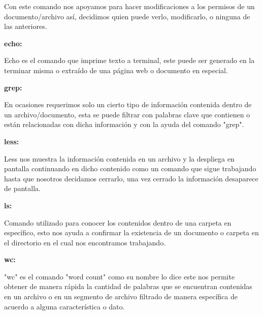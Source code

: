 \documentclass{article} %
\begin{document}
\vspace{0.5 cm}

Con este comando nos apoyamos para hacer modificaciones a los permisos de un documento/archivo así, decidimos quien puede verlo, modificarlo, o ninguna de las anteriores. 

\vspace{0.5 cm}


\textbf{echo:}

\vspace{0.5 cm}

Echo es el comando que imprime texto a terminal, este puede ser generado en la terminar misma o extraído de una página web o documento en especial.

\vspace{0.5 cm}


\textbf{grep:}  

\vspace{0.5 cm}

En ocasiones requerimos solo un cierto tipo de información contenida dentro de un archivo/documento, esta se puede filtrar con palabras clave que contienen o están relacionadas con dicha información y con la ayuda del comando "grep".

\vspace{0.5 cm}


\textbf{less:}  

\vspace{0.5 cm}

Less nos muestra la información contenida en un archivo y la despliega en pantalla continuando en dicho contenido como un comando que sigue trabajando hasta que nosotros decidamos cerrarlo, una vez cerrado la información desaparece de pantalla. 

\vspace{0.5 cm}


\textbf{ls:}

\vspace{0.5 cm}

Comando utilizado para conocer los contenidos dentro de una carpeta en específico, esto nos ayuda a confirmar la existencia de un documento o carpeta en el directorio en el cual nos encontramos trabajando.

\vspace{0.5 cm}


\textbf{wc:}

\vspace{0.5 cm}

"wc" es el comando "word count" como su nombre lo dice este nos permite obtener de manera rápida la cantidad de palabras que se encuentran contenidas en un archivo o en un segmento de archivo filtrado de manera específica de acuerdo a alguna característica o dato. 
\end{document}
